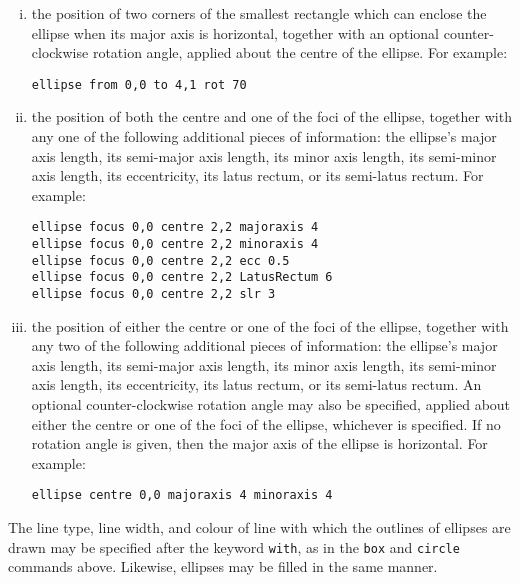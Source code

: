 \begin{enumerate}[(i)]
\item the position of two corners of the smallest rectangle which can enclose
the ellipse when its major axis is horizontal, together with an optional
counter-clockwise rotation angle, applied about the centre of the ellipse.
For example:

\begin{verbatim}
ellipse from 0,0 to 4,1 rot 70
\end{verbatim}

\item the position of both the centre and one of the foci of the ellipse,
together with any one of the following additional pieces of information: the
ellipse's major axis length, its semi-major axis length, its minor axis length,
its semi-minor axis length, its eccentricity, its latus rectum, or its
semi-latus rectum.  For example:

\begin{verbatim}
ellipse focus 0,0 centre 2,2 majoraxis 4
ellipse focus 0,0 centre 2,2 minoraxis 4
ellipse focus 0,0 centre 2,2 ecc 0.5
ellipse focus 0,0 centre 2,2 LatusRectum 6
ellipse focus 0,0 centre 2,2 slr 3
\end{verbatim}

\item the position of either the centre or one of the foci of the ellipse,
together with any two of the following additional pieces of information: the
ellipse's major axis length, its semi-major axis length, its minor axis length,
its semi-minor axis length, its eccentricity, its latus rectum, or its
semi-latus rectum. An optional counter-clockwise rotation angle may also be
specified, applied about either the centre or one of the foci of the ellipse,
whichever is specified. If no rotation angle is given, then the major axis of
the ellipse is horizontal.  For example:

\begin{verbatim}
ellipse centre 0,0 majoraxis 4 minoraxis 4
\end{verbatim}
\end{enumerate}

The line type, line width, and colour of line with which the outlines of
ellipses are drawn may be specified after the keyword {\tt with}, as in the
{\tt box} and {\tt circle} commands above. Likewise, ellipses may be filled in
the same manner.

